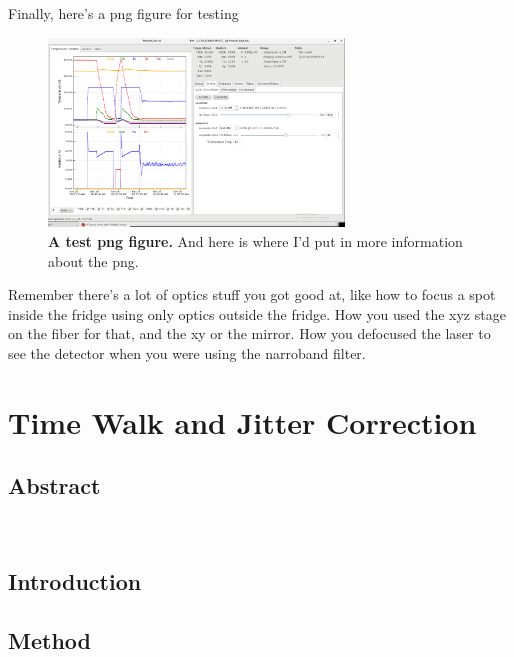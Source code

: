 \documentclass[11pt]{caltech_thesis} %
\begin{document}
Finally, here's a png figure for testing

\hypertarget{fig:test_png_figure}{%
\begin{figure}
\centering
\includegraphics[width=0.7\textwidth,height=\textheight]{chapter_01/figs_01/fridge.png}
\caption[{A png figure.}]{\textbf{A test png figure.} And here is where
I'd put in more information about the png.}
\label{fig:test_png_figure}
\end{figure}
}

Remember there's a lot of optics stuff you got good at, like how to
focus a spot inside the fridge using only optics outside the fridge. How
you used the xyz stage on the fiber for that, and the xy or the mirror.
How you defocused the laser to see the detector when you were using the
narroband filter.

\hypertarget{time-walk-and-jitter-correction}{%
\chapter{Time Walk and Jitter
Correction}\label{time-walk-and-jitter-correction}}

\hypertarget{abstract-1}{%
\section{Abstract}\label{abstract-1}}

~~~~~

\hypertarget{introduction-1}{%
\section{Introduction}\label{introduction-1}}

\hypertarget{method}{%
\section{Method}\label{method}}
\end{document}
